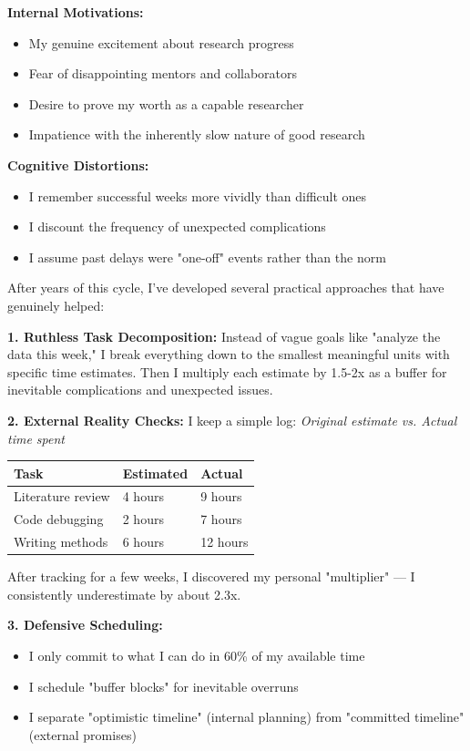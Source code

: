 \documentclass[11pt,a4paper]{article}
\begin{document}
\textbf{Internal Motivations:}
\begin{itemize}[leftmargin=1.5em]
    \item My genuine excitement about research progress
    \item Fear of disappointing mentors and collaborators
    \item Desire to prove my worth as a capable researcher
    \item Impatience with the inherently slow nature of good research
\end{itemize}

\textbf{Cognitive Distortions:}
\begin{itemize}[leftmargin=1.5em]
    \item I remember successful weeks more vividly than difficult ones
    \item I discount the frequency of unexpected complications
    \item I assume past delays were "one-off" events rather than the norm
\end{itemize}

\begin{tcolorbox}[colback=green!5,colframe=green!50,title={My Strategies for Change}]
After years of this cycle, I've developed several practical approaches that have genuinely helped:

\textbf{1. Ruthless Task Decomposition:}
Instead of vague goals like "analyze the data this week," I break everything down to the smallest meaningful units with specific time estimates. Then I multiply each estimate by 1.5-2x as a buffer for inevitable complications and unexpected issues.

\textbf{2. External Reality Checks:}
I keep a simple log: \textit{Original estimate vs. Actual time spent}
\begin{center}
\begin{tabular}{p{4cm}|p{3cm}|p{3cm}}
\toprule
\textbf{Task} & \textbf{Estimated} & \textbf{Actual} \\
\midrule
Literature review & 4 hours & 9 hours \\
Code debugging & 2 hours & 7 hours \\
Writing methods & 6 hours & 12 hours \\
\bottomrule
\end{tabular}
\end{center}
After tracking for a few weeks, I discovered my personal "multiplier" — I consistently underestimate by about 2.3x.

\textbf{3. Defensive Scheduling:}
\begin{itemize}[leftmargin=1.5em]
    \item I only commit to what I can do in 60\% of my available time
    \item I schedule "buffer blocks" for inevitable overruns
    \item I separate "optimistic timeline" (internal planning) from "committed timeline" (external promises)
\end{itemize}
\end{tcolorbox}
\end{document}
